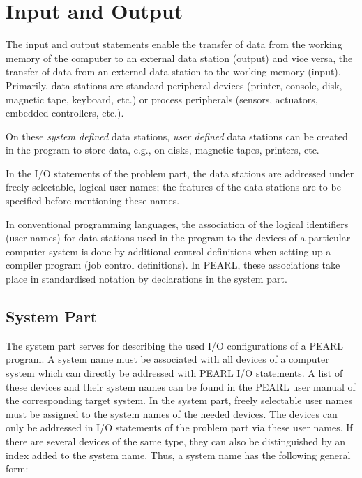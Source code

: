 
\chapter{Input and Output}   %

The input and output statements enable the transfer of data from the
working memory of the computer to an external data station (output) and
vice versa, the transfer of data from an external data station to the
working memory (input). Primarily, data stations are standard peripheral
devices (printer, console, disk, magnetic tape, keyboard, etc.) or
process peripherals (sensors, actuators, embedded controllers, etc.).

On these {\em system defined} data stations, {\em user defined} data
stations can be created in the program to store data, e.g., on disks,
magnetic tapes, printers, etc.

In the I/O statements of the problem part, the data stations are
addressed under freely selectable, logical user names; the features of
the data stations are to be specified before mentioning these names.

In conventional programming languages, the association of the logical
identifiers (user names) for data stations used in the program to the
devices of a particular computer system is done by additional control
definitions when setting up a compiler program (job control
definitions). In PEARL, these associations take place in standardised
notation by declarations in the system part.

\section{System Part}    %
\label{dation_system_part}

The system part serves for describing the used I/O configurations of a
PEARL program. A system name must be associated with all devices of a
computer system which can directly be addressed with PEARL I/O
statements. A list of these devices and their system names can be
found in the PEARL user manual of the corresponding target system. In
the system part, freely selectable user names must be assigned to the
system names of the needed devices. The devices can only be addressed in
I/O statements of the problem part via these user names. If there are
several devices of the same type, they can also be distinguished by an
index added to the system name. Thus, a system name has the following
general form:

